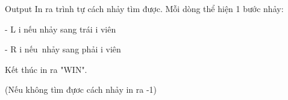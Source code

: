 Output
In ra trình tự cách nhảy tìm được. Mỗi dòng thể hiện 1 bước nhảy:   


   - L i  nếu nhảy sang trái i viên   


   - R i  nếu nhảy sang phải i viên   


   Kết thúc in ra "WIN".   


   (Nếu không tìm đựơc cách nhảy in ra -1)